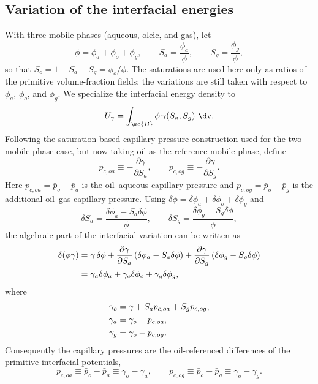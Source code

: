 \subsection{Variation of the interfacial energies}
\label{sec:var_gamma}

With three mobile phases (aqueous, oleic, and gas), let
\[
  \phi = \phi_a + \phi_o + \phi_g,
  \qquad
  S_a = \frac{\phi_a}{\phi},
  \qquad
  S_g = \frac{\phi_g}{\phi},
\]
so that $S_o = 1-S_a-S_g = \phi_o/\phi$.  The saturations are used here only as
ratios of the primitive volume-fraction fields; the variations are still taken
with respect to $\phi_a$, $\phi_o$, and $\phi_g$.  We specialize the interfacial energy density to
\[
  U_\gamma = \int_{\mc{B}} \phi\,\gamma\!\left(S_a,S_g\right)\,\dv.
\]
Following the saturation-based capillary-pressure construction used for the
two-mobile-phase case, but now taking oil as the reference mobile phase, define
\begin{equation}
  p_{c,oa} \equiv -\frac{\partial \gamma}{\partial S_a},
  \qquad
  p_{c,og} \equiv -\frac{\partial \gamma}{\partial S_g} .
  \label{eq:pc_def}
\end{equation}
Here $p_{c,oa}=\bar p_o-\bar p_a$ is the oil--aqueous capillary pressure and
$p_{c,og}=\bar p_o-\bar p_g$ is the additional oil--gas capillary pressure.
Using $\delta\phi=\delta\phi_a+\delta\phi_o+\delta\phi_g$ and
\[
  \delta S_a=\frac{\delta\phi_a-S_a\delta\phi}{\phi},
  \qquad
  \delta S_g=\frac{\delta\phi_g-S_g\delta\phi}{\phi},
\]
the algebraic part of the interfacial variation can be written as
\begin{align}
  \delta\!\left(\phi\gamma\right)
  &= \gamma\,\delta\phi
     + \frac{\partial\gamma}{\partial S_a}\left(\delta\phi_a-S_a\delta\phi\right)
     + \frac{\partial\gamma}{\partial S_g}\left(\delta\phi_g-S_g\delta\phi\right) \notag\\
  &= \gamma_a\delta\phi_a+\gamma_o\delta\phi_o+\gamma_g\delta\phi_g,
\end{align}
where
\begin{align}
  \gamma_o &= \gamma + S_a p_{c,oa}+S_g p_{c,og}, \notag\\
  \gamma_a &= \gamma_o-p_{c,oa}, \notag\\
  \gamma_g &= \gamma_o-p_{c,og}.
  \label{eq:primitive_gamma_derivatives}
\end{align}
Consequently the capillary pressures are the oil-referenced differences of the
primitive interfacial potentials,
\begin{equation}
  p_{c,oa} \equiv \bar p_o-\bar p_a \equiv \gamma_o-\gamma_a,
  \qquad
  p_{c,og} \equiv \bar p_o-\bar p_g \equiv \gamma_o-\gamma_g .
\end{equation}

